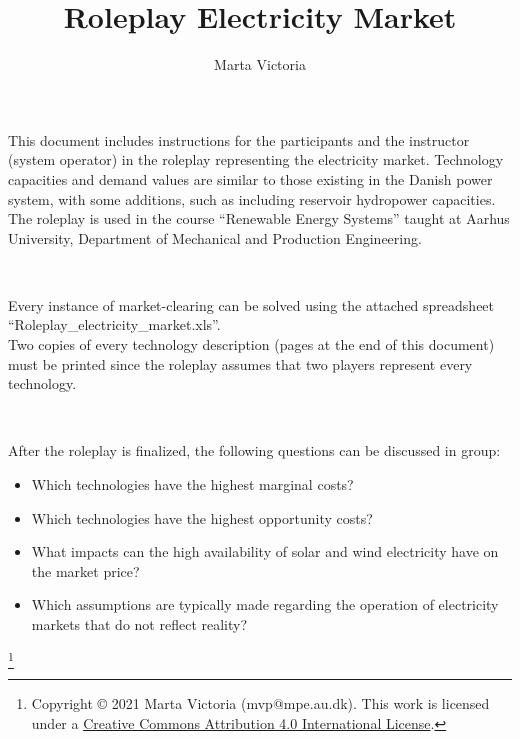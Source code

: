 \documentclass[3p]{elsarticle} %
\newcommand\blfootnote[1]{
  \begingroup
  \renewcommand\thefootnote{}\footnote{#1}
  \addtocounter{footnote}{-1}
  \endgroup
}
\begin{document}
\begin{frontmatter}

\title{ \textbf{Roleplay Electricity Market}}

\author[mymainaddress]{Marta Victoria}
\address[mymainaddress]{Department of Mechanical and Production Engineering, Aarhus University, Inge Lehmanns Gade 10, 8000 Aarhus, Denmark}

\end{frontmatter}
\pagestyle{empty}


This document includes instructions for the participants and the instructor (system operator) in the roleplay representing the electricity market. Technology capacities and demand values are similar to those existing in the Danish power system, with some additions, such as including reservoir hydropower capacities. The roleplay is used in the course “Renewable Energy Systems” taught at Aarhus University, Department of Mechanical and Production Engineering.

\

Every instance of market-clearing can be solved using the attached spreadsheet “Roleplay\_electricity\_market.xls”.\\

Two copies of every technology description (pages at the end of this document) must be printed since the roleplay assumes that two players represent every technology.

\

After the roleplay is finalized, the following questions can be discussed in group:

\begin{itemize}
\item Which technologies have the highest marginal costs?
\item Which technologies have the highest opportunity costs?
\item What impacts can the high availability of solar and wind electricity have on the market price?
\item Which assumptions are typically made regarding the operation of electricity markets that do not reflect reality?
\end{itemize}


\blfootnote{Copyright © 2021 Marta Victoria (mvp@mpe.au.dk). This work is licensed under a \href{https://creativecommons.org/licenses/by/4.0/} {Creative Commons Attribution 4.0 International License}.}


\newpage
\end{document}
